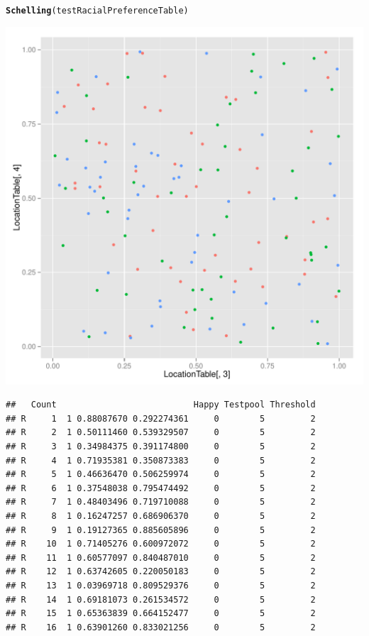 \documentclass{article}\usepackage[]{graphicx}\usepackage[]{color}
\makeatletter
\def\maxwidth{ %
  \ifdim\Gin@nat@width>\linewidth
    \linewidth
  \else
    \Gin@nat@width
  \fi
}
\newcommand{\hlstd}[1]{\textcolor[rgb]{0.345,0.345,0.345}{#1}}%
\newcommand{\hlkwd}[1]{\textcolor[rgb]{0.737,0.353,0.396}{\textbf{#1}}}%
\newenvironment{kframe}{%
 \def\at@end@of@kframe{}%
 \ifinner\ifhmode%
  \def\at@end@of@kframe{\end{minipage}}%
  \begin{minipage}{\columnwidth}%
 \fi\fi%
 \def\FrameCommand##1{\hskip\@totalleftmargin \hskip-\fboxsep
 \colorbox{shadecolor}{##1}\hskip-\fboxsep
     \hskip-\linewidth \hskip-\@totalleftmargin \hskip\columnwidth}%
 \MakeFramed {\advance\hsize-\width
   \@totalleftmargin\z@ \linewidth\hsize
   \@setminipage}}%
 {\par\unskip\endMakeFramed%
 \at@end@of@kframe}
\newenvironment{knitrout}{}{} %
\makeatother
\begin{document}
\begin{knitrout}
\begin{kframe}
\begin{alltt}
\hlkwd{Schelling}\hlstd{(testRacialPreferenceTable)}
\end{alltt}
\end{kframe}
\includegraphics[width=\maxwidth]{figure/unnamed-chunk-2-1} 
\begin{kframe}\begin{verbatim}
##   Count                           Happy Testpool Threshold
## R     1  1 0.88087670 0.292274361     0        5         2
## R     2  1 0.50111460 0.539329507     0        5         2
## R     3  1 0.34984375 0.391174800     0        5         2
## R     4  1 0.71935381 0.350873383     0        5         2
## R     5  1 0.46636470 0.506259974     0        5         2
## R     6  1 0.37548038 0.795474492     0        5         2
## R     7  1 0.48403496 0.719710088     0        5         2
## R     8  1 0.16247257 0.686906370     0        5         2
## R     9  1 0.19127365 0.885605896     0        5         2
## R    10  1 0.71405276 0.600972072     0        5         2
## R    11  1 0.60577097 0.840487010     0        5         2
## R    12  1 0.63742605 0.220050183     0        5         2
## R    13  1 0.03969718 0.809529376     0        5         2
## R    14  1 0.69181073 0.261534572     0        5         2
## R    15  1 0.65363839 0.664152477     0        5         2
## R    16  1 0.63901260 0.833021256     0        5         2

\end{verbatim}
\end{kframe}
\end{knitrout}
\end{document}
